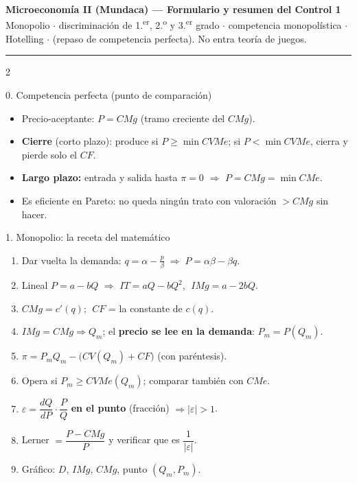 \documentclass[10pt]{article}
\begin{document}
\begin{center}
{\large\bfseries Microeconomía II (Mundaca) --- Formulario y resumen del Control 1}\\[2pt]
{\small Monopolio $\cdot$ discriminación de 1.\textsuperscript{er}, 2.\textsuperscript{o} y 3.\textsuperscript{er} grado $\cdot$ competencia monopolística $\cdot$ Hotelling $\cdot$ (repaso de competencia perfecta). No entra teoría de juegos.}
\end{center}
\vspace{-4pt}
\hrule
\vspace{4pt}

\begin{multicols}{2}

\begin{caja}{0. Competencia perfecta (punto de comparación)}
\begin{itemize}
\item Precio-aceptante: $P = CMg$ (tramo creciente del $CMg$).
\item \textbf{Cierre} (corto plazo): produce si $P \geq \min CVMe$; si $P < \min CVMe$, cierra y pierde solo el $CF$.
\item \textbf{Largo plazo:} entrada y salida hasta $\pi = 0$ $\Rightarrow$ $P = CMg = \min CMe$.
\item Es eficiente en Pareto: no queda ningún trato con valoración $> CMg$ sin hacer.
\end{itemize}
\end{caja}

\begin{caja}{1. Monopolio: la receta del matemático}
\begin{enumerate}
\item Dar vuelta la demanda: $q = \alpha - \frac{p}{\beta} \;\Rightarrow\; P = \alpha\beta - \beta q$.
\item Lineal $P = a - bQ$ $\Rightarrow$ $IT = aQ - bQ^2$, $\;IMg = a - 2bQ$.
\item $CMg = c'(q)$; $\;CF$ = la constante de $c(q)$.
\item $IMg = CMg \Rightarrow Q_m$; el \textbf{precio se lee en la demanda}: $P_m = P(Q_m)$.
\item $\pi = P_mQ_m - \big(CV(Q_m) + CF\big)$ \;(con paréntesis).
\item Opera si $P_m \geq CVMe(Q_m)$; comparar también con $CMe$.
\item $\varepsilon = \dfrac{dQ}{dP}\cdot\dfrac{P}{Q}$ \textbf{en el punto} (fracción) $\Rightarrow |\varepsilon| > 1$.
\item Lerner $= \dfrac{P - CMg}{P}$ y verificar que es $\dfrac{1}{|\varepsilon|}$.
\item Gráfico: $D$, $IMg$, $CMg$, punto $(Q_m, P_m)$.
\end{enumerate}
\end{caja}


\end{multicols}
\end{document}
